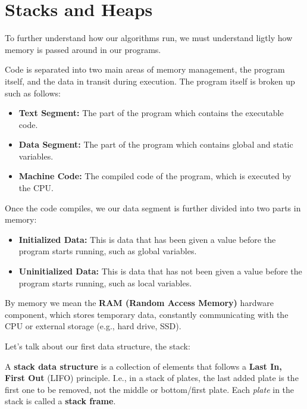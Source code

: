 \section{Stacks and Heaps}
\label{sec:stacks_heaps}

\noindent
To further understand how our algorithms run, we must understand ligtly how memory is passed around in our programs.

\begin{Def}

    \label{def:machine_code}

    Code is separated into two main areas of memory management, the program itself, and the data in transit during execution.
    The program itself is broken up such as follows:
    \begin{itemize}
        \item \textbf{Text Segment:} The part of the program which contains the executable code.
        \item \textbf{Data Segment:} The part of the program which contains global and static variables.
        \item \textbf{Machine Code:} The compiled code of the program, which is executed by the CPU.
    \end{itemize}

    \noindent
    Once the code compiles, we our data segment is further divided into two parts in memory:
    \begin{itemize}
        \item \textbf{Initialized Data:} This is data that has been given a value before the program starts running, such as global variables.
        \item \textbf{Uninitialized Data:} This is data that has not been given a value before the program starts running, such as local variables.
    \end{itemize}
    \noindent
    By memory we mean the \textbf{RAM (Random Access Memory)} hardware component, which stores temporary data, constantly 
    communicating with the CPU or external storage (e.g., hard drive, SSD).
\end{Def}

\noindent
Let's talk about our first data structure, the stack:
\begin{Def}[Stack]

    A \textbf{stack data structure} is a collection of elements that follows a \textbf{Last In, First Out} (LIFO) principle. I.e., in a 
    stack of plates, the last added plate is the first one to be removed, not the middle or bottom/first plate.
    Each \textit{plate} in the stack is called a \textbf{stack frame}.
\end{Def}


